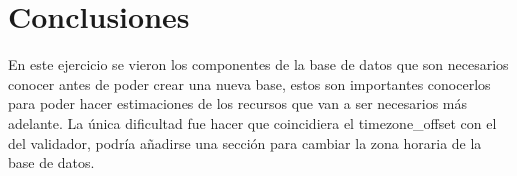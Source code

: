 \documentclass[journal]{IEEEtran}
\begin{document}
\section{Conclusiones}
En este ejercicio se vieron los componentes de la base de datos que 
son necesarios conocer antes de poder crear una nueva base, estos
son importantes conocerlos para poder hacer estimaciones de los 
recursos que van a ser necesarios más adelante. La única dificultad
fue hacer que coincidiera el timezone\_offset con el del validador,
podría añadirse una sección para cambiar la zona horaria de la base de datos.
\ifCLASSOPTIONcaptionsoff
  \newpage

\fi
\end{document}
